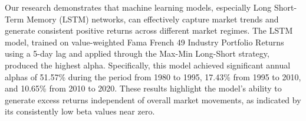 \documentclass{article}
\begin{document}


Our research demonstrates that machine learning models, especially Long Short-Term Memory (LSTM) networks, can effectively capture market trends and generate consistent positive returns across different market regimes. The LSTM model, trained on value-weighted Fama French 49 Industry Portfolio Returns using a 5-day lag and applied through the Max-Min Long-Short strategy, produced the highest alpha. Specifically, this model achieved significant annual alphas of 51.57\% during the period from 1980 to 1995, 17.43\% from 1995 to 2010, and 10.65\% from 2010 to 2020. These results highlight the model's ability to generate excess returns independent of overall market movements, as indicated by its consistently low beta values near zero.
\end{document}
